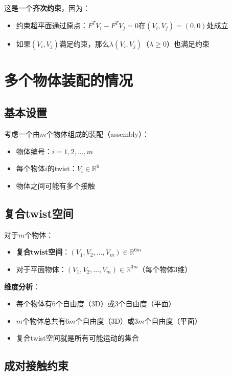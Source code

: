 \documentclass[12pt,a4paper]{article}
\begin{document}
这是一个\textbf{齐次约束}，因为：
\begin{itemize}
\item 约束超平面通过原点：$F^T V_i - F^T V_j = 0$在$(V_i, V_j) = (0, 0)$处成立
\item 如果$(V_i, V_j)$满足约束，那么$\lambda (V_i, V_j)$（$\lambda \geq 0$）也满足约束
\end{itemize}

\section{多个物体装配的情况}

\subsection{基本设置}

考虑一个由$m$个物体组成的装配（assembly）：
\begin{itemize}
\item 物体编号：$i = 1, 2, \ldots, m$
\item 每个物体$i$的twist：$V_i \in \mathbb{R}^6$
\item 物体之间可能有多个接触
\end{itemize}

\subsection{复合twist空间}

对于$m$个物体：
\begin{itemize}
\item \textbf{复合twist空间}：$(V_1, V_2, \ldots, V_m) \in \mathbb{R}^{6m}$
\item 对于平面物体：$(V_1, V_2, \ldots, V_m) \in \mathbb{R}^{3m}$（每个物体3维）
\end{itemize}

\textbf{维度分析}：
\begin{itemize}
\item 每个物体有6个自由度（3D）或3个自由度（平面）
\item $m$个物体总共有$6m$个自由度（3D）或$3m$个自由度（平面）
\item 复合twist空间就是所有可能运动的集合
\end{itemize}

\subsection{成对接触约束}
\end{document}
